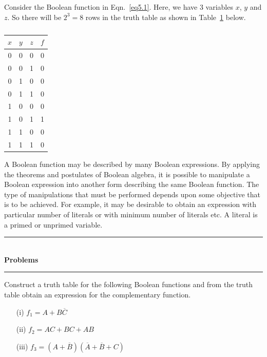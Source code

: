 Consider the Boolean function in Eqn.~\eqref{eq5.1}. Here, we have 3 variables $x$, $y$ and $z$. So there will be $2^{3}=8$ rows in the truth table as shown in Table~\ref{tab5.6} below.
\begin{table}[H]
\centering
\caption{}\label{tab5.6}
\tabcolsep=10pt
\renewcommand{\arraystretch}{1.4}
\begin{tabular}{|ccc|c|}
\hline
\boldmath$x$ & \boldmath$y$ & \boldmath$z$ & \boldmath$f$\\
\hline
0 & 0 & 0 & 0\\
0 & 0 & 1 & 0\\
0 & 1 & 0 & 0\\
0 & 1 & 1 & 0\\
1 & 0 & 0 & 0\\
1 & 0 & 1 & 1\\
1 & 1 & 0 & 0\\
1 & 1 & 1 & 0\\
\hline
\end{tabular}
\end{table}

\smallskip

A Boolean function may be described by many Boolean expressions. By applying the theorems and postulates of Boolean algebra, it is possible to manipulate a Boolean expression into another form describing the same Boolean function. The type of manipulations that must be performed depends upon some objective that is to be achieved. For example, it may be desirable to obtain an expression with particular number of literals or with minimum number of literals etc. A literal is a primed or unprimed variable.

\begin{center}
\rule{4cm}{1pt}\\
{\bf\Large Problems}\\[-3pt]
\rule{4cm}{1pt}
\end{center}

\begin{problem}\label{prob5.53}
Construct a truth table for the following Boolean functions and from the truth table obtain an expression for the complementary function.
\begin{itemize}
\item[(i)] $f_{1}=A+B\overline{C}$

\item[(ii)] $f_{2}=AC+BC+AB$

\item[(iii)] $f_{3}=(A+\overline{B})(\overline{A}+\overline{B}+C)$
\end{itemize}
\end{problem}


